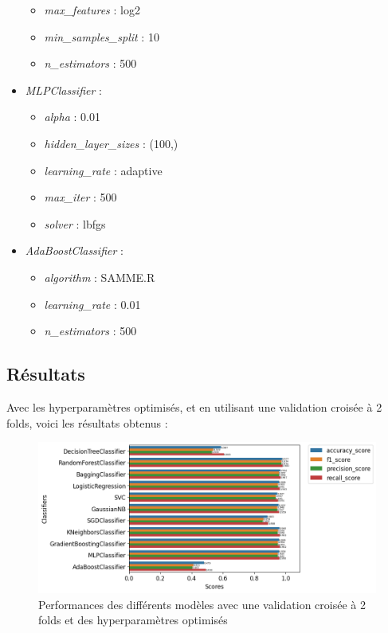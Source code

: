 \documentclass{article}
\begin{document}
\begin{footnotesize}
\begin{multicols}{2}
\begin{itemize}
\begin{itemize}
        \item \textit{max\_features} : log2
        \item \textit{min\_samples\_split} : 10
        \item \textit{n\_estimators} : 500
    \end{itemize}
    \item \textit{MLPClassifier} :
    \begin{itemize}
        \item \textit{alpha} : 0.01
        \item \textit{hidden\_layer\_sizes} : (100,)
        \item \textit{learning\_rate} : adaptive
        \item \textit{max\_iter} : 500
        \item \textit{solver} : lbfgs
    \end{itemize}
    \item \textit{AdaBoostClassifier} :
    \begin{itemize}
        \item \textit{algorithm} : SAMME.R
        \item \textit{learning\_rate} : 0.01
        \item \textit{n\_estimators} : 500
    \end{itemize}
\end{itemize}
\end{multicols}
\end{footnotesize}

\subsection{Résultats}
Avec les hyperparamètres optimisés, et en utilisant une validation croisée à 2 folds,
voici les résultats obtenus :

\begin{figure}[h]
    \centering
    \includegraphics[width=1.2\textwidth]{img/all_perfs_with_cv_and_best_hp.png}
    \caption{Performances des différents modèles avec une validation croisée à 2 folds et des hyperparamètres optimisés}
\end{figure}
\end{document}
